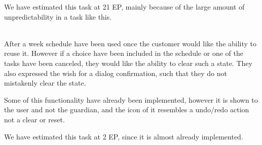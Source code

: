 \begin{description}[style=unboxed]
    We have estimated this task at 21 EP, mainly because of the large amount of unpredictability in a task like this. 

    \item[{[}\phigh{]} Week Schedule -- Clear Progress] \hfill \\ 
    After a week schedule have been used once the customer would like the ability to reuse it. 
    However if a choice have been included in the schedule or one of the tasks have been canceled, they would like the ability to clear such a state. 
    They also expressed the wish for a dialog confirmation, such that they do not mistakenly clear the state.

    Some of this functionality have already been implemented, however it is shown to the user and not the guardian, and the icon of it resembles a undo/redo action not a clear or reset. 

    We have estimated this task at 2 EP, since it is almost already implemented. 
\end{description}
